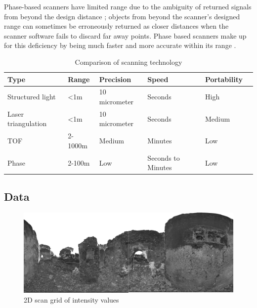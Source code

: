 Phase-based scanners have limited range due to the ambiguity of returned signals from beyond the design distance \cite{Bhurtha}; objects from beyond the scanner's designed range can sometimes be erroneously returned as closer distances when the scanner software fails to discard far away points. Phase based scanners make up for this deficiency by being much faster and more accurate within its range \cite{Form2014}.


\begin{table}
\begin{tabular}{ |l|l|l|l|l|l| }
  \hline
  Type &              Range &        Precision       & Speed & Portability \\
  \hline
  Structured light &    <1m     & 10 micrometer  & Seconds & High \\
  Laser triangulation & <1m     & 10 micrometer  & Seconds  & Medium \\     
  TOF &                 2-1000m & Medium      & Minutes & Low \\
  Phase &               2-100m & Low         & Seconds to Minutes & Low \\
  \hline  
\end{tabular}
\caption{Comparison of scanning technology}
\end{table}


\subsection{Data} \label{sec:data}


\begin{figure}[ht]
  \centering
  \includegraphics[width=1\linewidth]{images/grid}
  \caption{2D scan grid of intensity values \protect\footnotemark[\value{footnote}]}
  \label{fig:grid}
\end{figure}



